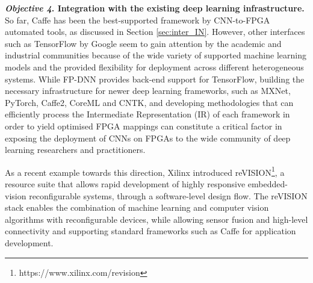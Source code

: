 \documentclass[format=acmsmall, review=false, screen=true]{acmart}
\begin{document}
\textbf{\textit{Objective 4}. Integration with the existing deep learning infrastructure.}
So far, Caffe has been the best-supported framework by CNN-to-FPGA automated tools, as discussed in Section \ref{sec:inter_IN}. However, other interfaces such as TensorFlow by Google seem to gain attention by the academic and industrial communities because of the wide variety of supported machine learning models and the provided flexibility for deployment across different heterogeneous systems. While FP-DNN provides back-end support for TensorFlow, building the necessary infrastructure for newer deep learning frameworks, such as MXNet, PyTorch, Caffe2, CoreML and CNTK, and developing methodologies that can efficiently process the Intermediate Representation (IR) of each framework in order to yield optimised FPGA mappings can constitute a critical factor in exposing the deployment of CNNs on FPGAs to the wide community of deep learning researchers and practitioners.



As a recent example towards this direction, Xilinx introduced reVISION\footnote{https://www.xilinx.com/revision}, a resource suite that allows rapid development of highly responsive embedded-vision reconfigurable systems, through a software-level design flow. The reVISION stack enables the combination of machine learning and computer vision algorithms with reconfigurable devices, while allowing sensor fusion and high-level connectivity and supporting standard frameworks such as Caffe for application development.
\end{document}
